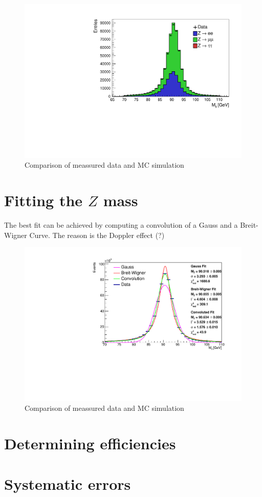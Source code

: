 \documentclass[12pt, a4paper, bibliography=totoc]{scrreprt}
\begin{document}
\begin{figure}[h]
	\centering
	\includegraphics[scale=0.5]{fig/vergleich_data_mc_final.pdf}
	\caption{Comparison of meassured data and MC simulation}
	\label{fig:data_mc}
\end{figure}

\section{Fitting the $Z$ mass}
The best fit can be achieved by computing a convolution of a Gauss and a Breit-Wigner Curve.
The reason is the Doppler effect (?)

\begin{figure}[h]
	\centering
	\includegraphics[scale=0.5]{fig/invar_z_mass.pdf}
	\caption{Comparison of meassured data and MC simulation}
	\label{fig:fit}
\end{figure}


\section{Determining efficiencies}


\section{Systematic errors}



\nocite{*}
\appendix
\printbibliography
\end{document}
